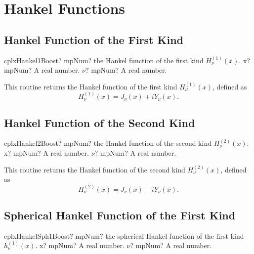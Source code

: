 \section{Hankel Functions}
\label{HankelFunctions}


\subsection{Hankel Function of the First Kind}

\begin{mpFunctionsExtract}
	\mpFunctionTwo
	{cplxHankel1Boost? mpNum? the Hankel function of the first kind $H_{\nu}^{(1)}(x)$.}
	{x? mpNum? A real number.}
	{$\nu$? mpNum? A real number.}
\end{mpFunctionsExtract}

\vspace{0.3cm}
This routine returns the Hankel function of the first kind $H_{\nu}^{(1)}(x)$, defined as
\begin{equation}
	H_{\nu}^{(1)}(x) = J_{\nu}(x) + iY_{\nu}(x).
\end{equation}



\subsection{Hankel Function of the Second Kind}

\begin{mpFunctionsExtract}
	\mpFunctionTwo
	{cplxHankel2Boost? mpNum? the Hankel function of the second kind $H_{\nu}^{(2)}(x)$.}
	{x? mpNum? A real number.}
	{$\nu$? mpNum? A real number.}
\end{mpFunctionsExtract}

\vspace{0.3cm}
This routine returns the Hankel function of the second kind $H_{\nu}^{(2)}(x)$, defined as
\begin{equation}
	H_{\nu}^{(2)}(x) = J_{\nu}(x) - iY_{\nu}(x).
\end{equation}



\subsection{Spherical Hankel Function of the First Kind}

\begin{mpFunctionsExtract}
	\mpFunctionTwo
	{cplxHankelSph1Boost? mpNum? the spherical Hankel function of the first kind $h_{\nu}^{(1)}(x)$.}
	{x? mpNum? A real number.}
	{$\nu$? mpNum? A real number.}
\end{mpFunctionsExtract}

